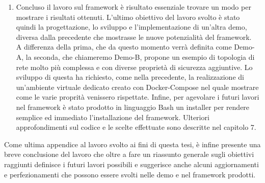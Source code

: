 \begin{enumerate}
    \item Concluso il lavoro sul framework è risultato essenziale trovare un modo per mostrare i risultati ottenuti. L'ultimo obiettivo del lavoro svolto è stato quindi la progettazione, lo sviluppo e l'implementazione di un'altra demo, diversa dalla precedente che mostrasse le nuove potenzialità del framework. \\
        A differenza della prima, che da questo momento verrà definita come Demo-A, la seconda, che chiameremo Demo-B, propone un esempio di topologia di rete molto più complessa e con diverse proprietà di sicurezza aggiuntive. Lo sviluppo di questa ha richiesto, come nella precedente, la realizzazione di un'ambiente virtuale dedicato creato con
        Docker-Compose nel quale mostrare come le varie proprità venissero rispettate. Infine, per agevolare i futuri lavori nel framework è stato prodotto in linguaggio Bash un installer per rendere semplice ed immediato l'installazione del framework. Ulteriori approfondimenti sul codice e le scelte effettuate sono descritte nel capitolo 7.
\end{enumerate}

Come ultima appendice al lavoro svolto ai fini di questa tesi, è infine presente una breve conclusione del lavoro che oltre a fare un riassunto generale sugli obiettivi raggiunti definisce i futuri lavori possibili e suggerisce anche alcuni aggiornamenti e perfezionamenti che possono essere svolti nelle demo e nel framework prodotti.
